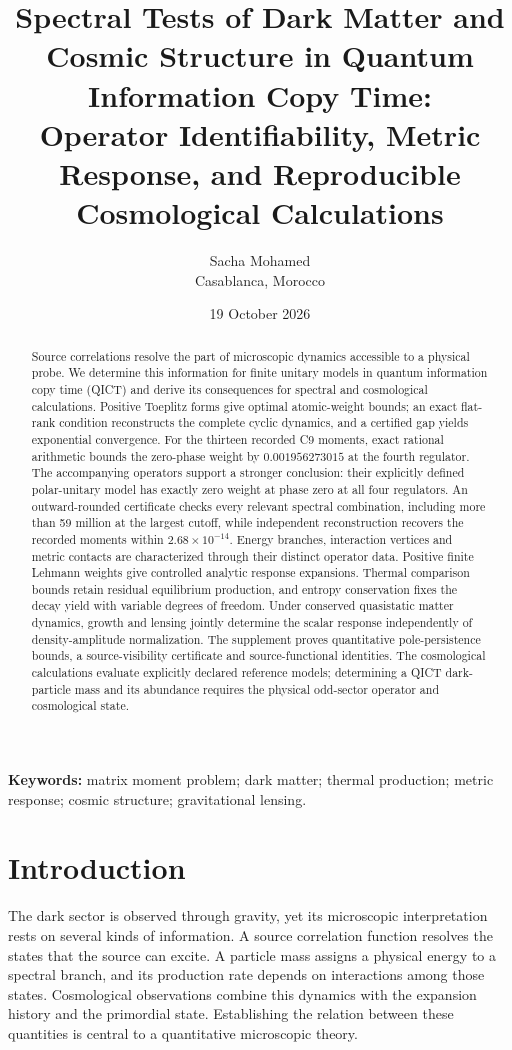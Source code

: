 \documentclass[11pt,a4paper]{article}
\title{\bfseries Spectral Tests of Dark Matter and Cosmic Structure in Quantum Information Copy Time:\\[5pt]
\large Operator Identifiability, Metric Response, and Reproducible Cosmological Calculations}
\author{Sacha Mohamed\\\small Casablanca, Morocco}
\date{19 October 2026}
\numberwithin{equation}{section}
\begin{document}
\maketitle
\begin{abstract}
Source correlations resolve the part of microscopic dynamics accessible to a physical probe. We determine this information for finite unitary models in quantum information copy time (QICT) and derive its consequences for spectral and cosmological calculations. Positive Toeplitz forms give optimal atomic-weight bounds; an exact flat-rank condition reconstructs the complete cyclic dynamics, and a certified gap yields exponential convergence. For the thirteen recorded C9 moments, exact rational arithmetic bounds the zero-phase weight by $0.001956273015$ at the fourth regulator. The accompanying operators support a stronger conclusion: their explicitly defined polar-unitary model has exactly zero weight at phase zero at all four regulators. An outward-rounded certificate checks every relevant spectral combination, including more than 59 million at the largest cutoff, while independent reconstruction recovers the recorded moments within $2.68\times10^{-14}$. Energy branches, interaction vertices and metric contacts are characterized through their distinct operator data. Positive finite Lehmann weights give controlled analytic response expansions. Thermal comparison bounds retain residual equilibrium production, and entropy conservation fixes the decay yield with variable degrees of freedom. Under conserved quasistatic matter dynamics, growth and lensing jointly determine the scalar response independently of density-amplitude normalization. The supplement proves quantitative pole-persistence bounds, a source-visibility certificate and source-functional identities. The cosmological calculations evaluate explicitly declared reference models; determining a QICT dark-particle mass and its abundance requires the physical odd-sector operator and cosmological state.
\end{abstract}
\noindent\textbf{Keywords:} matrix moment problem; dark matter; thermal production; metric response; cosmic structure; gravitational lensing.
\section{Introduction}
The dark sector is observed through gravity, yet its microscopic interpretation rests on several kinds of information. A source correlation function resolves the states that the source can excite. A particle mass assigns a physical energy to a spectral branch, and its production rate depends on interactions among those states. Cosmological observations combine this dynamics with the expansion history and the primordial state. Establishing the relation between these quantities is central to a quantitative microscopic theory.
\end{document}
